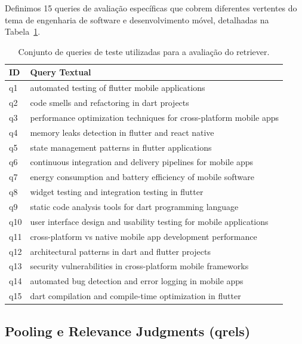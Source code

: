 \documentclass[12pt]{article}
\begin{document}
Definimos 15 queries de avaliação específicas que cobrem diferentes vertentes do tema de engenharia de software e desenvolvimento móvel, detalhadas na Tabela~\ref{tab:queries_teste}.

\begin{table}[htbp]
\centering
\caption{Conjunto de queries de teste utilizadas para a avaliação do retriever.}
\label{tab:queries_teste}
\begin{tabular}{lp{12.5cm}}
\toprule
\textbf{ID} & \textbf{Query Textual} \\ \midrule
q1 & automated testing of flutter mobile applications \\
q2 & code smells and refactoring in dart projects \\
q3 & performance optimization techniques for cross-platform mobile apps \\
q4 & memory leaks detection in flutter and react native \\
q5 & state management patterns in flutter applications \\
q6 & continuous integration and delivery pipelines for mobile apps \\
q7 & energy consumption and battery efficiency of mobile software \\
q8 & widget testing and integration testing in flutter \\
q9 & static code analysis tools for dart programming language \\
q10 & user interface design and usability testing for mobile applications \\
q11 & cross-platform vs native mobile app development performance \\
q12 & architectural patterns in dart and flutter projects \\
q13 & security vulnerabilities in cross-platform mobile frameworks \\
q14 & automated bug detection and error logging in mobile apps \\
q15 & dart compilation and compile-time optimization in flutter \\ \bottomrule
\end{tabular}
\end{table}

\subsection{Pooling e Relevance Judgments (qrels)}
\end{document}
